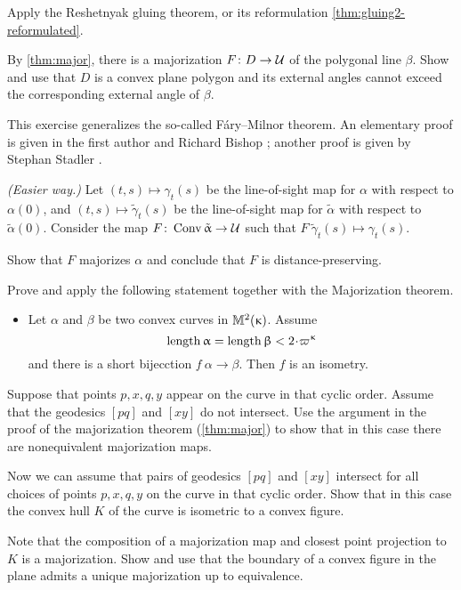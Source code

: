 Apply the Reshetnyak gluing theorem, or its reformulation \ref{thm:gluing2-reformulated}.


 By \ref{thm:major}, there is a majorization $F\:D\to\spc{U}$ of the polygonal line $\beta$.
Show and use that $D$ is a convex plane polygon and its external angles cannot exceed the corresponding external angle of $\beta$.


 This exercise generalizes the so-called Fáry–Milnor theorem.
An elementary proof is given in the first author and Richard Bishop \cite{alexander-bishop:fm};
another proof is given by Stephan Stadler \cite{stadler}.

\textit{(Easier way.)} 
Let 
$(t,s)\mapsto \gamma_t(s)$ be the line-of-sight map 
for $\alpha$ with respect to $\alpha(0)$,
and 
$(t,s)\mapsto \tilde \gamma_t(s)$ be the line-of-sight map 
for $\tilde \alpha$ with respect to $\tilde \alpha(0)$.
Consider the map  $F\:\Conv\tilde \alpha\to \spc{U}$ such that 
$F\:\tilde \gamma_t(s)\mapsto \gamma_t(s)$.

Show that $F$ majorizes $\alpha$
and conclude that $F$ is distance-preserving.

Prove and apply the following statement together with the Majorization theorem.
\begin{itemize}
\item Let $\alpha$ and $\beta$ be two convex curves in $\mathbb{M}_{{}}^{2}({\upkappa})$.
Assume 
\[\length \alpha=\length\beta<2\cdot\varpi\kappa\]
and there is a short bijecction $f\:\alpha\to\beta$.
Then $f$ is an isometry.
\end{itemize}

Suppose that points $p,x,q,y$ appear on the curve in that cyclic order.
Assume that the geodesics $[pq]$ and $[xy]$ do not intersect.
Use the argument in the proof of the majorization theorem (\ref{thm:major}) to show that in this case there are nonequivalent majorization maps.

Now we can assume that pairs of geodesics $[pq]$ and $[xy]$ intersect for all choices of points $p,x,q,y$ on the curve in that cyclic order.
Show that in this case the convex hull $K$ of the curve is isometric to a convex figure.

Note that the composition of a majorization map and closest point projection to $K$ is a majorization.
Show and use that the boundary of a convex figure in the plane admits a unique majorization up to equivalence.

